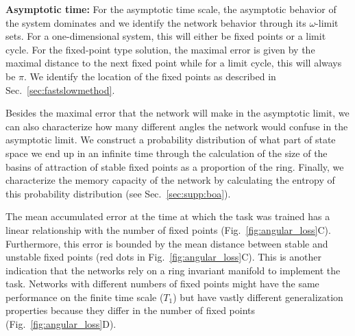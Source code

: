 \documentclass{article} %
\newcommand{\ptitle}[1]{\textbf{#1:}\xspace}
\newcounter{ct}
\theoremstyle{definition}
\theoremstyle{remark}
\begin{document}
\ptitle{Asymptotic time}
For the asymptotic time scale, the asymptotic behavior of the system dominates and we identify the network behavior through its \(\omega\)-limit sets.
For a one-dimensional system, this will either be fixed points or a limit cycle.
For the fixed-point type solution, the maximal error is given by the maximal distance to the next fixed point while for a limit cycle, this will always be \(\pi\).
We identify the location of the fixed points as described in Sec.~\ref{sec:fastslowmethod}.

Besides the maximal error that the network will make in the asymptotic limit, we can also characterize how many different angles the network would confuse in the asymptotic limit.
We construct a probability distribution of what part of state space we end up in an infinite time through the calculation of the size of the basins of attraction of stable fixed points as a proportion of the ring.
Finally, we characterize the memory capacity of the network by calculating the entropy of this probability distribution (see Sec.~\ref{sec:supp:boa}).

The mean accumulated error at the time at which the task was trained has a linear relationship with the number of fixed points (Fig.~\ref{fig:angular_loss}C).
Furthermore, this error is bounded by the mean distance between stable and unstable fixed points (red dots in Fig.~\ref{fig:angular_loss}C).
This is another indication that the networks rely on a ring invariant manifold to implement the task.
Networks with different numbers of fixed points might have the same performance on the finite time scale (\(T_1\)) but have vastly different generalization properties because they differ in the number of fixed points (Fig.~\ref{fig:angular_loss}D).
\end{document}

